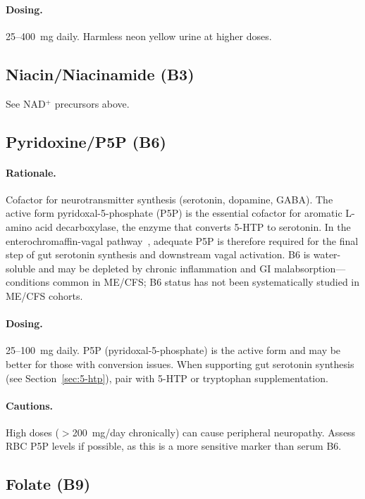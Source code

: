 \paragraph{Dosing.} 25--400~mg daily. Harmless neon yellow urine at higher doses.

\subsection{Niacin/Niacinamide (B3)}

See NAD$^+$ precursors above.

\subsection{Pyridoxine/P5P (B6)}

\paragraph{Rationale.} Cofactor for neurotransmitter synthesis (serotonin, dopamine, GABA). The active form pyridoxal-5-phosphate (P5P) is the essential cofactor for aromatic L-amino acid decarboxylase, the enzyme that converts 5-HTP to serotonin. In the enterochromaffin-vagal pathway~\cite{WirthScheibenbogen2025Neurotransmitter, Barton2025}, adequate P5P is therefore required for the final step of gut serotonin synthesis and downstream vagal activation. B6 is water-soluble and may be depleted by chronic inflammation and GI malabsorption---conditions common in ME/CFS; B6 status has not been systematically studied in ME/CFS cohorts.

\paragraph{Dosing.} 25--100~mg daily. P5P (pyridoxal-5-phosphate) is the active form and may be better for those with conversion issues. When supporting gut serotonin synthesis (see Section~\ref{sec:5-htp}), pair with 5-HTP or tryptophan supplementation.

\paragraph{Cautions.} High doses ($>$200~mg/day chronically) can cause peripheral neuropathy. Assess RBC P5P levels if possible, as this is a more sensitive marker than serum B6.

\subsection{Folate (B9)}

